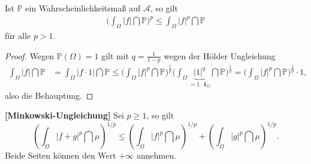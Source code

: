 \begin{korollar}
		 Ist $\mathbb{P}$ ein Wahrscheinlichkeitsmaß auf $\mathcal A$, so gilt
		 \begin{align*}
			\Bigg(\int_{\Omega} |f| \dint\mathbb{P}\Bigg)^{p}  \leq  \int_{\Omega} |f|^p \dint \mathbb{P}
		 \end{align*}
		 f\"ur alle $p>1$.
\end{korollar}
\begin{proof}
		Wegen $\mathbb{P}(\Omega) = 1$ gilt mit $q=\frac{1}{1-p}$ wegen der H\"older Ungleichung
		\begin{align*}
		\int_{\Omega} |f| \dint\mathbb{P} &= \int_{\Omega} |f \cdot 1| \dint\mathbb{P}
		 \leq \Bigg( \int_{\Omega} |f|^p \dint \mathbb{P} \Bigg)^{\frac{1}{p}} \Bigg( \int_{\Omega} \underbrace{|1|^q}_{= 1 \cdot \mathbf{1}_{\Omega}} \dint \mathbb{P} \Bigg)^{\frac{1}{q}}
		= \Bigg( \int_{\Omega} |f|^p \dint \mathbb{P} \Bigg)^{\frac{1}{p}} \cdot 1,
		\end{align*}
		also die Behauptung.
\end{proof}

\begin{satz}\label{minkowski}
 \textbf{[Minkowski-Ungleichung]}
	Sei $p \geq 1$, so gilt
	\[ \left( \int_{\Omega} |f+g|^{p} \dint \mu \right)^{1/p}\leq \left( \int_{\Omega} |f|^{p} \dint \mu \right)^{1/p} + \left( \int_{\Omega} |g|^p \dint \mu \right)^{1/p}. \]
	Beide Seiten k\"onnen den Wert $+\infty$ annehmen.
\end{satz}

